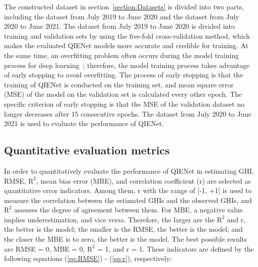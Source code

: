 \documentclass[review]{elsarticle}
\begin{document}
The constructed dataset in section~\ref{section:Datasets} is divided into two parts, including the dataset from July 2019 to June 2020 and the dataset from July 2020 to June 2021.
The dataset from July 2019 to June 2020 is divided into training and validation sets by using the five-fold cross-validation method, which makes the evaluated QIENet models more accurate and credible for training.
At the same time, an overfitting problem often occurs during the model training process for deep learning~\citep{Dietterich1995, OH2022122921}; therefore, the model training process takes advantage of early stopping to avoid overfitting.
The process of early stopping is that the training of QIENet is conducted on the training set, and mean square error (MSE) of the model on the validation set is calculated every other epoch.
The specific criterion of early stopping is that the MSE of the validation dataset no longer decreases after 15 consecutive epochs.
The dataset from July 2020 to June 2021 is used to evaluate the performance of QIENet.

\subsection{Quantitative evaluation metrics} %
\label{sub:Quantitative evaluation metrics}
In order to quantitatively evaluate the performance of QIENet in estimating GHI, RMSE, $\mathrm{R^2}$, mean bias error (MBE), and correlation coefficient (r) are selected as quantitative error indicators.
Among them, r with the range of [-1, +1] is used to measure the correlation between the estimated GHIs and the observed GHIs, and $\mathrm{R^2}$ assesses the degree of agreement between them.
For MBE, a negative value implies underestimation, and vice versa.
Therefore, the larger are the $\mathrm{R^2}$ and r, the better is the model; the smaller is the RMSE, the better is the model; and the closer the MBE is to zero, the better is the model.
The best possible results are RMSE = 0, MBE = 0, $\mathrm{R^{2}}$ = 1, and r = 1.
These indicators are defined by the following equations (\ref{eq:RMSE}) - (\ref{eq:r}), respectively:
\end{document}
